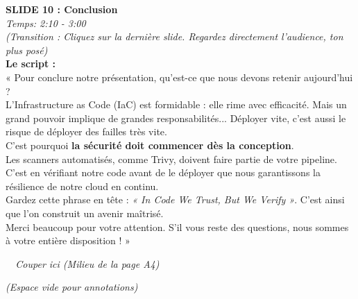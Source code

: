\documentclass[a4paper,12pt]{article}
\begin{document}
\begin{minipage}[t][0.45\textheight]{\textwidth}
\textbf{\huge SLIDE 10 : Conclusion}\\
\normalsize \textit{Temps: 2:10 - 3:00}\\

\large
\textit{(Transition : Cliquez sur la dernière slide. Regardez directement l'audience, ton plus posé)}\\

\textbf{Le script :}\\
« Pour conclure notre présentation, qu'est-ce que nous devons retenir aujourd'hui ?\\

L'Infrastructure as Code (IaC) est formidable : elle rime avec efficacité. Mais un grand pouvoir implique de grandes responsabilités... Déployer vite, c'est aussi le risque de déployer des failles très vite. \\
C'est pourquoi \textbf{la sécurité doit commencer dès la conception}.\\

Les scanners automatisés, comme Trivy, doivent faire partie de votre pipeline. C'est en vérifiant notre code avant de le déployer que nous garantissons la résilience de notre cloud en continu.\\

Gardez cette phrase en tête : \textit{« In Code We Trust, But We Verify »}. C'est ainsi que l'on construit un avenir maîtrisé.\\

Merci beaucoup pour votre attention. S'il vous reste des questions, nous sommes à votre entière disposition ! »
\end{minipage}

\vspace*{\fill}
\begin{center}
\noindent\dotfill\textit{\small \ \ Couper ici (Milieu de la page A4)\ \ }\dotfill\\
\end{center}
\vspace*{\fill}

\begin{minipage}[t][0.45\textheight]{\textwidth}
\begin{center}
\vspace*{3cm}
\textit{\Huge (Espace vide pour annotations)}
\end{center}
\end{minipage}
\end{document}
